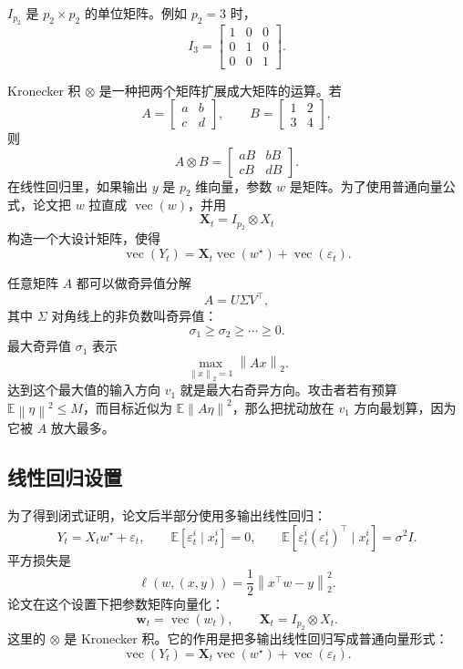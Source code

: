 \documentclass[UTF8,fontset=none,11pt]{ctexart}
\theoremstyle{cnstyle}
\newcommand{\E}{\mathbb{E}}
\newcommand{\vect}{\operatorname{vec}}
\newcommand{\norm}[1]{\left\lVert #1\right\rVert}
\begin{document}
\(I_{p_2}\) 是 \(p_2\times p_2\) 的单位矩阵。例如 \(p_2=3\) 时，
\[
  I_3=
  \begin{bmatrix}
  1&0&0\\
  0&1&0\\
  0&0&1
  \end{bmatrix}.
\]

Kronecker 积 \(\otimes\) 是一种把两个矩阵扩展成大矩阵的运算。若
\[
  A=
  \begin{bmatrix}
  a&b\\
  c&d
  \end{bmatrix},
  \qquad
  B=
  \begin{bmatrix}
  1&2\\
  3&4
  \end{bmatrix},
\]
则
\[
  A\otimes B=
  \begin{bmatrix}
  aB&bB\\
  cB&dB
  \end{bmatrix}.
\]
在线性回归里，如果输出 \(y\) 是 \(p_2\) 维向量，参数 \(w\) 是矩阵。为了使用普通向量公式，论文把 \(w\) 拉直成 \(\vect(w)\)，并用
\[
  \mathbf X_t=I_{p_2}\otimes X_t
\]
构造一个大设计矩阵，使得
\[
  \vect(Y_t)=\mathbf X_t\vect(w^\star)+\vect(\varepsilon_t).
\]

任意矩阵 \(A\) 都可以做奇异值分解
\[
  A=U\Sigma V^\top,
\]
其中 \(\Sigma\) 对角线上的非负数叫奇异值：
\[
  \sigma_1\ge\sigma_2\ge\cdots\ge0.
\]
最大奇异值 \(\sigma_1\) 表示
\[
  \max_{\norm{x}_2=1}\norm{Ax}_2.
\]
达到这个最大值的输入方向 \(v_1\) 就是最大右奇异方向。攻击者若有预算
\(\E\norm{\eta}^2\le M\)，而目标近似为 \(\E\norm{A\eta}^2\)，那么把扰动放在 \(v_1\) 方向最划算，因为它被 \(A\) 放大最多。

\subsection{线性回归设置}

为了得到闭式证明，论文后半部分使用多输出线性回归：
\begin{equation}
  Y_t=X_tw^\star+\varepsilon_t,
  \qquad
  \E[\varepsilon_t^i\mid x_t^i]=0,
  \qquad
  \E[\varepsilon_t^i(\varepsilon_t^i)^\top\mid x_t^i]=\sigma^2I .
  \label{eq:linear-model}
\end{equation}
平方损失是
\[
  \ell(w,(x,y))=\frac12\norm{x^\top w-y}_2^2 .
\]
论文在这个设置下把参数矩阵向量化：
\[
  \mathbf w_t=\vect(w_t),\qquad
  \mathbf X_t=I_{p_2}\otimes X_t .
\]
这里的 \(\otimes\) 是 Kronecker 积。它的作用是把多输出线性回归写成普通向量形式：
\[
  \vect(Y_t)=\mathbf X_t\vect(w^\star)+\vect(\varepsilon_t).
\]
\end{document}
